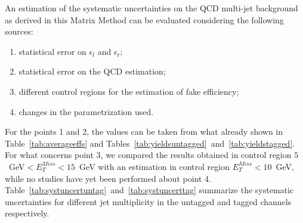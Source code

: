 \begin{table}[h!tb]\centering
{}
\caption{Yields table for the data and background samples for different jet multiplicities in the tagged full event selection (at least one bjet).}\label{tab:yieldstagged}
\end{table} 


An estimation of the systematic uncertainties on the QCD multi-jet background
as derived in this Matrix Method
can be evaluated considering the following sources:
\begin{enumerate}
 \item statistical error on  $\epsilon_\mathrm{f}$ and  $\epsilon_\mathrm{r}$;
\item statistical error on the QCD estimation;
\item different control regions for the estimation of fake efficiency;
\item changes in the parametrization used.
\end{enumerate} 
For the points 1 and 2, the values can be taken from what already 
shown in Table~\ref{tab:averageeffs} and 
Tables~\ref{tab:yieldsuntagged}~and~\ref{tab:yieldstagged}. For what 
concerns point 3, we compared the results obtained in control region 
$5$~GeV$< E^{Miss}_T<15$~GeV with an estimation in control region 
$ E^{Miss}_T<10$~GeV, while no studies have yet been performed about 
point 4. Table~\ref{tab:systuncertuntag}~and~\ref{tab:systuncerttag} 
summarize the systematic uncertainties for different jet multiplicity 
in the untagged and tagged channels respectively.


